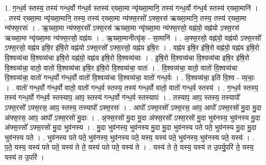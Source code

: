 \documentclass[17pt]{extarticle}
\begin{document}
1. ग॒न्ध॒र्व स्तस्य॒ तस्य॑ गन्ध॒र्वो ग॑न्ध॒र्व स्तस्य॑ र्‌ख्सा॒मा न्यृ॑ख्सा॒मानि॒ तस्य॑ गन्ध॒र्वो ग॑न्ध॒र्व स्तस्य॑ र्‌ख्सा॒मानि॑ । . तस्य॑ र्‌ख्सा॒मा न्यृ॑ख्सा॒मानि॒ तस्य॒ तस्य॑ र्‌ख्सा॒मा न्य॑फ्स॒रसो᳚ ऽफ्स॒रस॑ ऋख्सा॒मानि॒ तस्य॒ तस्य॑ र्‌ख्सा॒मा न्य॑फ्स॒रसः॑ । . ऋ॒ख्सा॒मा न्य॑फ्स॒रसो᳚ ऽफ्स॒रस॑ ऋख्सा॒मा न्यृ॑ख्सा॒मा न्य॑फ्स॒रसो॒ वह्न॑यो॒ वह्न॑यो ऽफ्स॒रस॑ ऋख्सा॒मा न्यृ॑ख्सा॒मा न्य॑फ्स॒रसो॒ वह्न॑यः । . ऋ॒ख्सा॒मानीत्यृ॑क् - सा॒मानि॑ । . अ॒फ्स॒रसो॒ वह्न॑यो॒ वह्न॑यो ऽफ्स॒रसो᳚ ऽफ्स॒रसो॒ वह्न॑य इषि॒र इ॑षि॒रो वह्न॑यो ऽफ्स॒रसो᳚ ऽफ्स॒रसो॒ वह्न॑य इषि॒रः । . वह्न॑य इषि॒र इ॑षि॒रो वह्न॑यो॒ वह्न॑य इषि॒रो वि॒श्वव्य॑चा वि॒श्वव्य॑चा इषि॒रो वह्न॑यो॒ वह्न॑य इषि॒रो वि॒श्वव्य॑चाः । . इ॒षि॒रो वि॒श्वव्य॑चा वि॒श्वव्य॑चा इषि॒र इ॑षि॒रो वि॒श्वव्य॑चा॒ वातो॒ वातो॑ वि॒श्वव्य॑चा इषि॒र इ॑षि॒रो वि॒श्वव्य॑चा॒ वातः॑ । . वि॒श्वव्य॑चा॒ वातो॒ वातो॑ वि॒श्वव्य॑चा वि॒श्वव्य॑चा॒ वातो॑ गन्ध॒र्वो ग॑न्ध॒र्वो वातो॑ वि॒श्वव्य॑चा वि॒श्वव्य॑चा॒ वातो॑ गन्ध॒र्वः । . वि॒श्वव्य॑चा॒ इति॑ वि॒श्व - व्य॒चाः॒ । . वातो॑ गन्ध॒र्वो ग॑न्ध॒र्वो वातो॒ वातो॑ गन्ध॒र्व स्तस्य॒ तस्य॑ गन्ध॒र्वो वातो॒ वातो॑ गन्ध॒र्व स्तस्य॑ । . ग॒न्ध॒र्व स्तस्य॒ तस्य॑ गन्ध॒र्वो ग॑न्ध॒र्व स्तस्याप॒ आप॒ स्तस्य॑ गन्ध॒र्वो ग॑न्ध॒र्व स्तस्यापः॑ । . तस्याप॒ आप॒ स्तस्य॒ तस्यापो᳚ ऽफ्स॒रसो᳚ ऽफ्स॒रस॒ आप॒ स्तस्य॒ तस्यापो᳚ ऽफ्स॒रसः॑ । . आपो᳚ ऽफ्स॒रसो᳚ ऽफ्स॒रस॒ आप॒ आपो᳚ ऽफ्स॒रसो॑ मु॒दा मु॒दा अ॑फ्स॒रस॒ आप॒ आपो᳚ ऽफ्स॒रसो॑ मु॒दाः । . अ॒फ्स॒रसो॑ मु॒दा मु॒दा अ॑फ्स॒रसो᳚ ऽफ्स॒रसो॑ मु॒दा भुव॑नस्य॒ भुव॑नस्य मु॒दा अ॑फ्स॒रसो᳚ ऽफ्स॒रसो॑ मु॒दा भुव॑नस्य । . मु॒दा भुव॑नस्य॒ भुव॑नस्य मु॒दा मु॒दा भुव॑नस्य पते पते॒ भुव॑नस्य मु॒दा मु॒दा भुव॑नस्य पते । . भुव॑नस्य पते पते॒ भुव॑नस्य॒ भुव॑नस्य पते॒ यस्य॒ यस्य॑ पते॒ भुव॑नस्य॒ भुव॑नस्य पते॒ यस्य॑ । . प॒ते॒ यस्य॒ यस्य॑ पते पते॒ यस्य॑ ते ते॒ यस्य॑ पते पते॒ यस्य॑ ते । . यस्य॑ ते ते॒ यस्य॒ यस्य॑ त उ॒पर्यु॒परि॑ ते॒ यस्य॒ यस्य॑ त उ॒परि॑ । \newline
\end{document}
